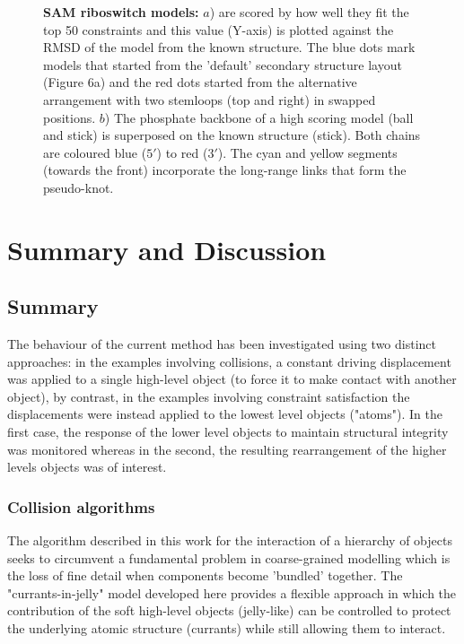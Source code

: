 \documentclass[review]{elsarticle}
\begin{document}
{{{{{\begin{figure}
\centering
{}
\caption{
\label{Fig:ribo}
{\bf SAM riboswitch models:} $a$) are scored by how well they fit the top 50 constraints
and this value (Y-axis) is plotted against the RMSD of the model from the known structure.
The blue dots mark models that started from the 'default' secondary structure layout
(Figure 6a) and the red dots started from the alternative arrangement with two stemloops
(top and right) in swapped positions.
$b$) The phosphate backbone of a high scoring model (ball and stick) is superposed on the 
known structure (stick).  Both chains are coloured blue ($5'$) to red ($3'$).
The cyan and yellow segments (towards the front) incorporate the long-range links that
form the pseudo-knot.
}
\end{figure}

\clearpage
\section{Summary and Discussion}

\subsection{Summary}

The behaviour of the current method has been investigated using two distinct
approaches: in the examples involving collisions, a constant driving displacement
was applied to a single high-level object (to force it to make contact with 
another object), by contrast,  in the examples involving constraint satisfaction the 
displacements were instead applied to the lowest level objects ("atoms").  In the first
case, the response of the lower level objects to maintain structural integrity was monitored
whereas in the second, the resulting rearrangement of the higher levels objects was of interest.

\subsubsection{Collision algorithms}

The algorithm described in this work for the interaction of a hierarchy of objects
seeks to circumvent a fundamental problem in coarse-grained modelling which
is the loss of fine detail when components become 'bundled' together.
The "currants-in-jelly" model developed here provides a flexible approach in which
the contribution of the soft high-level objects (jelly-like) can be controlled
to protect the underlying atomic structure (currants) while still allowing
them to interact.

}}}}}
\end{document}
